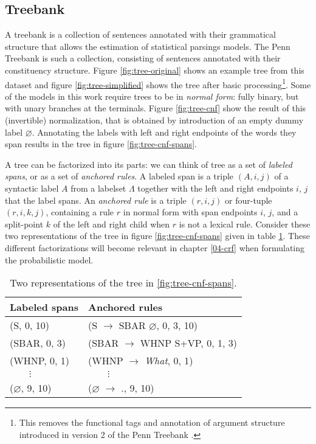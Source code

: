   \subsection{Treebank}
    A treebank is a collection of sentences annotated with their grammatical structure that allows the estimation of statistical parsings models. The Penn Treebank \citep{marcus1993penn} is such a collection, consisting of sentences annotated with their constituency structure. Figure \ref{fig:tree-original} shows an example tree from this dataset and figure \ref{fig:tree-simplified} shows the tree after basic processing\footnote{This removes the functional tags and annotation of argument structure introduced in version 2 of the Penn Treebank \citep{marcus1994annotating}.}. Some of the models in this work require trees to be in \textit{normal form}: fully binary, but with unary branches at the terminals. Figure \ref{fig:tree-cnf} show the result of this (invertible) normalization, that is obtained by introduction of an empty dummy label $\varnothing$. Annotating the labels with left and right endpoints of the words they span results in the tree in figure \ref{fig:tree-cnf-spans}.

    A tree can be factorized into its parts: we can think of tree as a set of \textit{labeled spans}, or as a set of \textit{anchored rules}. A labeled span is a triple $(A, i, j)$ of a syntactic label $A$ from a labelset $\Lambda$ together with the left and right endpoints $i$, $j$ that the label spans. An \textit{anchored rule} is a triple $(r, i, j)$ or four-tuple $(r, i, k, j)$, containing a rule $r$ in normal form with span endpoints $i$, $j$, and a split-point $k$ of the left and right child when $r$ is not a lexical rule. Consider these two representations of the tree in figure \ref{fig:tree-cnf-spans} given in table \ref{tab:spans-rules}. These different factorizations will become relevant in chapter \ref{04-crf} when formulating the probabilistic model.

    \begin{table}[h]
      \center
      \small
      \bgroup  %
      \def\arraystretch{1.5}  %
      \begin{tabular}{l|l}
        Labeled spans & Anchored rules \\
        \hline
        (S, 0, 10)     & (S $\to$ SBAR $\varnothing$, 0, 3, 10)  \\
        (SBAR, 0, 3)   & (SBAR $\to$ WHNP S+VP, 0, 1, 3)  \\
        (WHNP, 0, 1)     & (WHNP $\to$ \textit{What}, 0, 1)  \\
        $\qquad\vdots$ & $\qquad\vdots$  \\
        ($\varnothing$, 9, 10)     & ($\varnothing$ $\to$ ., 9, 10)  \\
      \end{tabular}
      \caption{Two representations of the tree in \ref{fig:tree-cnf-spans}.}
      \label{tab:spans-rules}
      \egroup  %
    \end{table}


